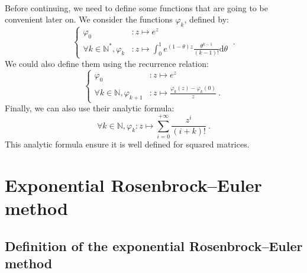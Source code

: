     \paragraph{}
    Before continuing, we need to define some functions that are going to be convenient later on.
    We consider the functions $\varphi_k$, defined by:
    \begin{equation}
      \left\{\begin{aligned}
        \varphi_0 &: z \mapsto e^z \\
        \forall k \in \mathbb{N}^*, \varphi_{k} &: z \mapsto \int_0^1 e^{\left(1 - \theta\right)z} \frac{\theta^{k-1}}{\left(k-1\right)!} \mathrm{d}\theta
      \end{aligned}\right.\ .
    \end{equation}
    We could also define them using the recurrence relation:
    \begin{equation}
      \left\{\begin{aligned}
        \varphi_0 &: z \mapsto e^z \\
        \forall k \in \mathbb{N}, \varphi_{k+1} &: z \mapsto \frac{\varphi_k\left(z\right) - \varphi_k\left(0\right)}{z} \ .
      \end{aligned}\right.
    \end{equation}
    Finally, we can also use their analytic formula:
    \begin{equation}
      \forall k \in \mathbb{N}, \varphi_{k} : z \mapsto \sum_{i = 0}^{+\infty} \frac{z^i}{\left(i + k\right)!} \ .
    \end{equation}
    This analytic formula ensure it is well defined for squared matrices.


  \section{Exponential Rosenbrock--Euler method}

    \subsection{Definition of the exponential Rosenbrock--Euler method}

